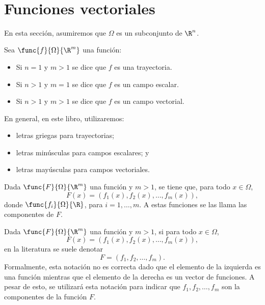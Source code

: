 \documentclass[a4,11pt]{aleph-notas}
\begin{document}
\encabezado

\


\section{Funciones vectoriales}

En esta sección, asumiremos que $\Omega$ es un subconjunto de $\R^n$.
\begin{defi}
    Sea $\func{f}{\Omega}{\R^m}$ una función:
    \begin{itemize}
        \item Si $n=1$ y $m>1$ se dice que $f$ es una trayectoria.
        \item Si $n>1$ y $m=1$ se dice que $f$ es un campo escalar.
        \item Si $n>1$ y $m>1$ se dice que $f$ es un campo vectorial.
    \end{itemize}
\end{defi}

\begin{advertencia}
    En general, en este libro, utilizaremos:
    \begin{itemize}
        \item letras griegas para trayectorias;
        \item letras minúsculas para campos escalares; y
        \item letras mayúsculas para campos vectoriales.
    \end{itemize}
\end{advertencia}

\begin{defi}[Componentes]
    Dada $\func{F}{\Omega}{\R^m}$ una función y $m>1$, se tiene que, para todo $x\in \Omega$,
    \[
        F(x)=(f_1(x),f_2(x),\ldots,f_m(x)),
    \]
    donde $\func{f_i}{\Omega}{\R}$, para $i=1,\ldots,m$. A estas funciones se las llama las componentes de $F$.
\end{defi}

\begin{advertencia}
    Dada $\func{F}{\Omega}{\R^m}$ una función y $m>1$, si para todo $x\in \Omega$,
    \[
        F(x)=(f_1(x),f_2(x),\ldots,f_m(x)),
    \]
    en la literatura se suele denotar
    \[
        F=(f_1,f_2,\ldots,f_m).
    \]
    Formalmente, esta notación no es correcta dado que el elemento de la izquierda es una función mientras que el elemento de la derecha es un vector de funciones. A pesar de esto, se utilizará esta notación para indicar que $f_1,f_2,\ldots,f_m$ son la componentes de la función $F$.
\end{advertencia}
\end{document}
